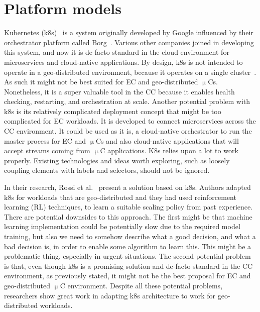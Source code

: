 \section{Platform models}\label{sec:platform_models}
%
Kubernetes (k8s)~\cite{BurnsGOBW16} is a system originally developed by Google influenced by their orchestrator platform called Borg~\cite{VermaPKOTW15}. Various other companies joined in developing this system, and now it is de facto standard in the cloud environment for microservices and cloud-native applications. By design, k8s is not intended to operate in a geo-distributed environment, because it operates on a single cluster~\cite{BurnsGOBW16, VermaPKOTW15, RossiCPN20}. As such it might not be best suited for EC and geo-distributed $\upmu$Cs. Nonetheless, it is a super valuable tool in the CC because it enables health checking, restarting, and orchestration at scale. Another potential problem with k8s is its relatively complicated deployment concept that might be too complicated for EC workloads. It is developed to connect microservices across the CC environment. It could be used as it is, a cloud-native orchestrator to run the master process for EC and $\upmu$Cs and also cloud-native applications that will accept streams coming from $\upmu$C applications. K8s relies upon a lot to work properly. Existing technologies and ideas worth exploring, such as loosely coupling elements with labels and selectors, should not be ignored.

In their research, Rossi et al.~\cite{RossiCPN20} present a solution based on k8s. Authors adapted k8s for workloads that are geo-distributed and they had used reinforcement learning (RL) techniques, to learn a suitable scaling policy from past experience. There are potential downsides to this approach. The first might be that machine learning implementation could be potentially slow due to the required model training, but also we need to somehow describe what a good decision, and what a bad decision is, in order to enable some algorithm to learn this. This might be a problematic thing, especially in urgent situations. The second potential problem is that, even though k8s is a promising solution and de-facto standard in the CC environment, as previously stated, it might not be the best proposal for EC and geo-distributed $\upmu$C environment. Despite all these potential problems, researchers show great work in adapting k8s architecture to work for geo-distributed workloads.

